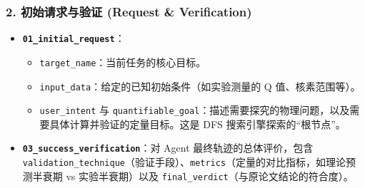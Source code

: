 \documentclass[12pt,a4paper]{article}
\begin{document}
\subsubsection{2. 初始请求与验证 (Request \& Verification)}
\begin{itemize}
\item \textbf{\texttt{01\_initial\_request}}：
  \begin{itemize}
  \item \texttt{target\_name}：当前任务的核心目标。
  \item \texttt{input\_data}：给定的已知初始条件（如实验测量的 Q 值、核素范围等）。
  \item \texttt{user\_intent} 与 \texttt{quantifiable\_goal}：描述需要探究的物理问题，以及需要具体计算并验证的定量目标。这是 DFS 搜索引擎探索的“根节点”。
  \end{itemize}
\item \textbf{\texttt{03\_success\_verification}}：对 Agent 最终轨迹的总体评价，包含 \texttt{validation\_technique}（验证手段）、\texttt{metrics}（定量的对比指标，如理论预测半衰期 vs 实验半衰期）以及 \texttt{final\_verdict}（与原论文结论的符合度）。
\end{itemize}
\end{document}
